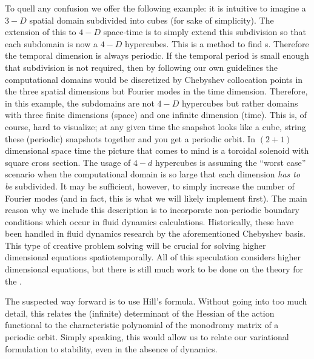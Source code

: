 \begin{description}
{To quell any confusion we offer the following example: it is
intuitive to imagine a $3-D$ spatial domain subdivided into
cubes (for sake of simplicity). The extension of this to $4-D$
space-time is to simply extend this subdivision so that
each subdomain is now a $4-D$ hypercubes. This is a method
to find {\po}s. Therefore the temporal dimension is always periodic.
If the temporal period is small enough that subdivision is not required,
then by following our own guidelines the computational domains
would be discretized by Chebyshev collocation points in the three
spatial dimensions but Fourier modes in the time dimension. Therefore,
in this example, the subdomains are not $4-D$ hypercubes but rather
domains with three finite dimensions (space) and one infinite dimension (time).
This is, of course, hard to visualize; at any given time the
snapshot looks like a cube, string these (periodic) snapshots together
and you get a periodic orbit. In $(2+1)$ dimensional space time the
picture that comes to mind is a toroidal solenoid with square cross section.
The usage of $4-d$ hypercubes is assuming the ``worst case'' scenario
when the computational domain is so large that each dimension \emph{has to be}
subdivided.
It may be sufficient, however, to simply increase the number of Fourier modes
(and in fact, this is what we will likely implement first).
The main reason why we include this description is to incorporate non-periodic
boundary conditions which occur in fluid dynamics calculations. Historically, these
have been handled in fluid dynamics research by the aforementioned
Chebyshev basis. This type of creative problem solving will be crucial for
solving higher dimensional equations spatiotemporally. All of this speculation
considers higher dimensional equations, but there is still much work to be
done on the theory for the \KSe.

The suspected way forward
is to use Hill's formula. Without going into too much detail, this relates
the (infinite) determinant of the Hessian of the action functional
to the characteristic polynomial of the monodromy matrix of a periodic
orbit. Simply speaking, this would allow us to relate our variational
formulation to stability, even in the absence of dynamics. %

}

\end{description}
